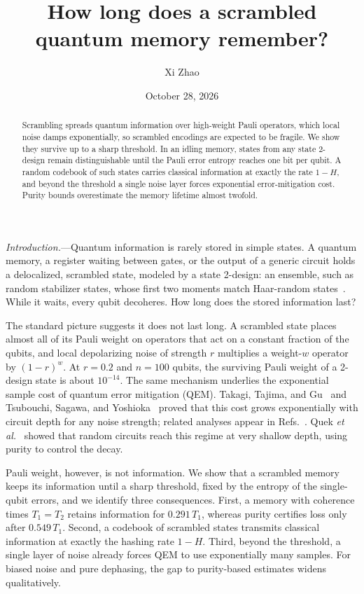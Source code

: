\documentclass[aps,prl,reprint,superscriptaddress,amsmath,amssymb]{revtex4-2}
\begin{document}
\title{How long does a scrambled quantum memory remember?}
\author{Xi Zhao}\noaffiliation
\date{October 28, 2026}
\begin{abstract}
Scrambling spreads quantum information over high-weight Pauli operators, which
local noise damps exponentially, so scrambled encodings are expected to be
fragile. We show they survive up to a sharp threshold. In an idling memory,
states from any state 2-design remain distinguishable until the Pauli error
entropy reaches one bit per qubit. A random codebook of such states carries
classical information at exactly the rate $1-H$, and beyond the threshold a
single noise layer forces exponential error-mitigation cost. Purity bounds
overestimate the memory lifetime almost twofold.
\end{abstract}
\maketitle

\emph{Introduction.}---Quantum information is rarely stored in simple states.
A quantum memory, a register waiting between gates, or the output of a generic
circuit holds a delocalized, scrambled state, modeled by a state 2-design: an
ensemble, such as random stabilizer states, whose first two moments match
Haar-random states~\cite{KuengGross}. While it waits, every qubit decoheres.
How long does the stored information last?

The standard picture suggests it does not last long. A scrambled state places
almost all of its Pauli weight on operators that act on a constant fraction of
the qubits, and local depolarizing noise of strength $r$ multiplies a weight-$w$
operator by $(1-r)^w$. At $r=0.2$ and $n=100$ qubits, the surviving Pauli
weight of a 2-design state is about $10^{-14}$. The same mechanism underlies the
exponential sample cost of quantum error mitigation (QEM). Takagi, Tajima, and
Gu~\cite{Takagi} and Tsubouchi, Sagawa, and Yoshioka~\cite{Tsubouchi} proved
that this cost grows exponentially with circuit depth for any noise strength;
related analyses appear in Refs.~\cite{TakagiPRR,TakagiNPJ}. Quek
\emph{et al.}~\cite{Quek} showed that random circuits reach this regime at very
shallow depth, using purity to control the decay.

Pauli weight, however, is not information. We show that a scrambled memory
keeps its information until a sharp threshold, fixed by the entropy of the
single-qubit errors, and we identify three consequences. First, a memory with
coherence times $T_1=T_2$ retains information for $0.291\,T_1$, whereas purity
certifies loss only after $0.549\,T_1$. Second, a codebook of scrambled states
transmits classical information at exactly the hashing rate $1-H$. Third, beyond
the threshold, a single layer of noise already forces QEM to use exponentially
many samples. For biased noise and pure dephasing, the gap to purity-based
estimates widens qualitatively.
\end{document}
